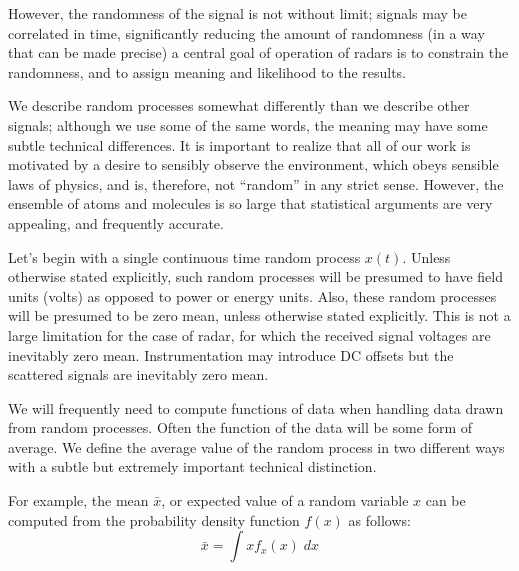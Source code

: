 However, the randomness of the signal is not without limit; signals may be correlated 
in time, significantly reducing the amount of randomness (in a way that can be
made precise) a central
goal of operation of radars is to constrain the randomness, and to
assign meaning and likelihood to the results.

We describe random processes somewhat differently than we describe
other signals; although we use some of the same words, the meaning may
have some subtle technical differences.  It is important to realize
that all of our work is motivated by a desire to sensibly observe the
environment, which obeys sensible laws of physics, and is, therefore,
not ``random'' in any strict sense.  However, the ensemble of atoms
and molecules is so large that statistical arguments are very
appealing, and frequently accurate.  

Let's begin with a single continuous time random process $x(t)$.
Unless otherwise stated explicitly, such random processes will be
presumed to have field units (volts) as opposed to power or energy
units.  Also, these random processes will be presumed to be zero mean,
unless otherwise stated explicitly.  This is not a large limitation
for the case of radar, for which the received signal voltages are
inevitably zero mean.  Instrumentation may introduce DC offsets but
the scattered signals are inevitably zero mean.

We will frequently need to compute functions of data when handling
data drawn from random processes.  Often the function of the data will
be some form of average.  We define the average value of the random
process in two different ways with a subtle but extremely important
technical distinction.



For example, the mean $\bar{x}$, or expected value of a random
variable $x$ can be computed from the probability density function
$f(x)$ as follows:
\begin{equation}
\bar{x} = \int x f_x(x) \; dx
\end{equation}

